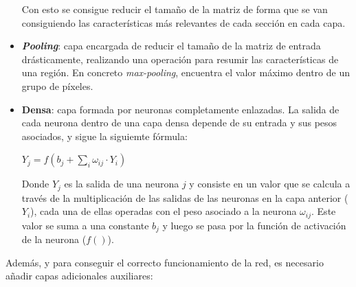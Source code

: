 \documentclass{uc3mpracticas}
\begin{document}
\begin{itemize}
    \vspace{2mm}

    Con esto se consigue reducir el tamaño de la matriz de forma que se van consiguiendo las características más relevantes de cada sección en cada capa.


    \item \textbf{\textit{Pooling}}: capa encargada de reducir el tamaño de la matriz de entrada drásticamente, realizando una operación para resumir las características de una región. En concreto \textit{max-pooling}, encuentra el valor máximo dentro de un grupo de píxeles.

    \item \textbf{Densa}: capa formada por neuronas completamente enlazadas. La salida de cada neurona dentro de una capa densa depende de su entrada y sus pesos asociados, y sigue la siguiemte fórmula:

    \begin{center}
      $ \displaystyle Y_{j}=f\left(b_{j}+\sum_{i}\omega_{ij} \cdot Y_{i}\right)$
    \end{center}


    Donde $\displaystyle Y_{j}$ es la salida de una neurona $\displaystyle j$ y consiste en un valor que se calcula a través de la multiplicación de las salidas de las neuronas en la capa anterior ($\displaystyle Y_{i}$), cada una de ellas operadas con el peso asociado a la neurona $\omega_{ij}$. Este valor se suma a una constante $\displaystyle b_{j}$ y luego se pasa por la función de activación de la neurona ($\displaystyle f()$).

  \end{itemize}

  Además, y para conseguir el correcto funcionamiento de la red, es necesario añadir capas adicionales auxiliares:
\end{document}
